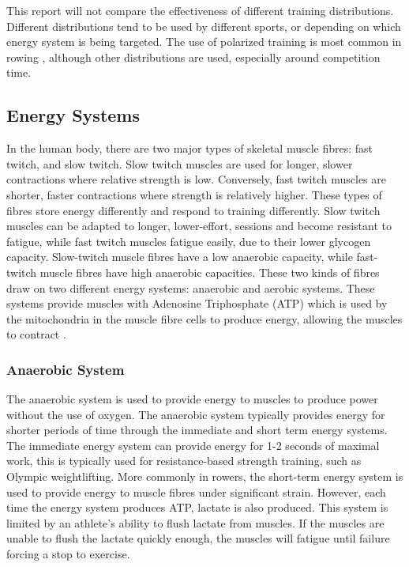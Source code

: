 This report will not compare the effectiveness of different training distributions. Different distributions tend to be used by different sports, or depending on which energy system is being targeted. The use of polarized training is most common in rowing \autocite{Rosenblat2019}, although other distributions are used, especially around competition time.


\subsection{Energy Systems}
\label{sub:energy_systems}
In the human body, there are two major types of skeletal muscle fibres: fast twitch, and slow twitch. Slow twitch muscles are used for longer, slower contractions where relative strength is low. Conversely, fast twitch muscles are shorter, faster contractions where strength is relatively higher. These types of fibres store energy differently and respond to training differently. Slow twitch muscles can be adapted to longer, lower-effort, sessions and become resistant to fatigue, while fast twitch muscles fatigue easily, due to their lower glycogen capacity. Slow-twitch muscle fibres have a low anaerobic capacity, while fast-twitch muscle fibres have high anaerobic capacities. These two kinds of fibres draw on two different energy systems: anaerobic and aerobic systems. These systems provide muscles with Adenosine Triphosphate (ATP) which is used by the mitochondria in the muscle fibre cells to produce energy, allowing the muscles to contract \cite{Göktepe2007}. 

\subsubsection{Anaerobic System}
The anaerobic system is used to provide energy to muscles to produce power without the use of oxygen. The anaerobic system typically provides energy for shorter periods of time through the immediate and short term energy systems. The immediate energy system can provide energy for 1-2 seconds of maximal work, this is typically used for resistance-based strength training, such as Olympic weightlifting. More commonly in rowers, the short-term energy system is used to provide energy to muscle fibres under significant strain. However, each time the energy system produces ATP, lactate is also produced. This system is limited by an athlete's ability to flush lactate from muscles. If the muscles are unable to flush the lactate quickly enough, the muscles will fatigue until failure forcing a stop to exercise. 

